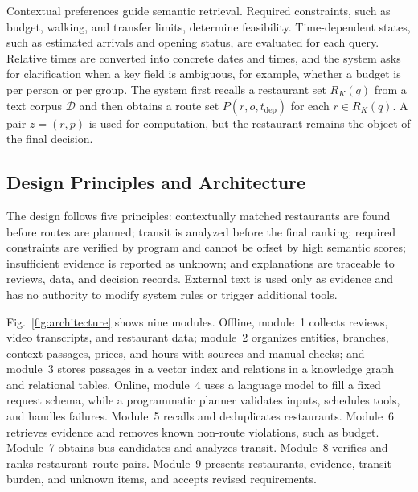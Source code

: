 \documentclass[conference]{IEEEtran}
\begin{document}
Contextual preferences guide semantic retrieval. Required constraints, such as budget, walking, and transfer limits, determine feasibility. Time-dependent states, such as estimated arrivals and opening status, are evaluated for each query. Relative times are converted into concrete dates and times, and the system asks for clarification when a key field is ambiguous, for example, whether a budget is per person or per group. The system first recalls a restaurant set $R_K(q)$ from a text corpus $\mathcal{D}$ and then obtains a route set $P(r,o,t_{\mathrm{dep}})$ for each $r \in R_K(q)$. A pair $z=(r,p)$ is used for computation, but the restaurant remains the object of the final decision.

\subsection{Design Principles and Architecture}
The design follows five principles: contextually matched restaurants are found before routes are planned; transit is analyzed before the final ranking; required constraints are verified by program and cannot be offset by high semantic scores; insufficient evidence is reported as unknown; and explanations are traceable to reviews, data, and decision records. External text is used only as evidence and has no authority to modify system rules or trigger additional tools.

Fig.~\ref{fig:architecture} shows nine modules. Offline, module~1 collects reviews, video transcripts, and restaurant data; module~2 organizes entities, branches, context passages, prices, and hours with sources and manual checks; and module~3 stores passages in a vector index and relations in a knowledge graph and relational tables. Online, module~4 uses a language model to fill a fixed request schema, while a programmatic planner validates inputs, schedules tools, and handles failures. Module~5 recalls and deduplicates restaurants. Module~6 retrieves evidence and removes known non-route violations, such as budget. Module~7 obtains bus candidates and analyzes transit. Module~8 verifies and ranks restaurant--route pairs. Module~9 presents restaurants, evidence, transit burden, and unknown items, and accepts revised requirements.
\end{document}

